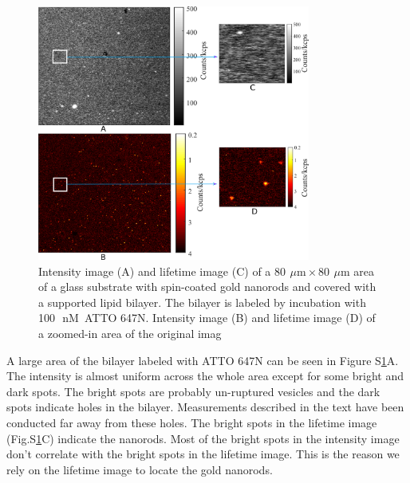 \documentclass[11pt,a4paper,onecolumn]{article}
\newcommand{\um}{\ensuremath{\,\mu\textrm{m}}}
\newcommand{\nM}{\ensuremath{\,\textrm{nM}}}
\begin{document}
\begin{figure}[ht]
  \centering
  \includegraphics[width=0.8\textwidth]{xy_with_zoom.png}
  \makeatletter
  \renewcommand{\fnum@figure}{\figurename~S\thefigure}
  \makeatother{}
  \caption{ Intensity image (A) and lifetime image (C) of a $80~\um\times80~\um$ area of a glass substrate with spin-coated gold nanorods and covered with a supported lipid bilayer. The bilayer is labeled by incubation with 100~\nM~ATTO 647N. Intensity image (B) and lifetime image (D) of a zoomed-in area of the original imag}
  \label{SIfig:xy-scan}
\end{figure}

A large area of the bilayer labeled with ATTO 647N can be seen in Figure S\ref{SIfig:xy-scan}A. The intensity is almost uniform across the whole area except for some bright and dark spots. The bright spots are
probably un-ruptured vesicles and the dark spots indicate holes in the bilayer. Measurements
described in the text have been conducted far away from these holes. The bright spots in the
lifetime image (Fig.S\ref{SIfig:xy-scan}C) indicate the nanorods. Most of the bright spots in the intensity image don't correlate with the bright spots in the lifetime image. This is the reason we rely on the
lifetime image to locate the gold nanorods.\\

\newpage
\end{document}
